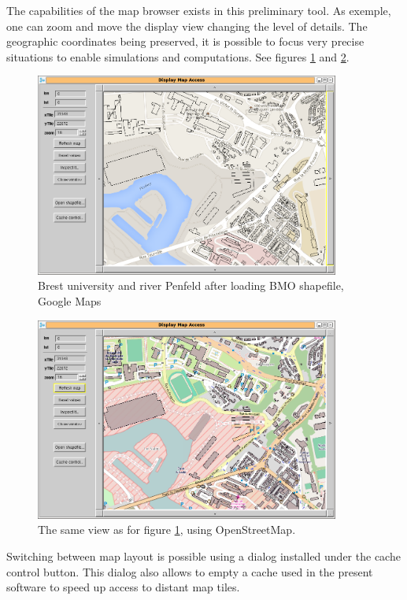 The capabilities of the map browser exists in this preliminary tool. 
As exemple, one can zoom and move the display view changing the level 
of details. The geographic coordinates being preserved, it is possible 
to focus very precise situations to enable simulations and computations. 
See figures \ref{fig:mapAccessGMap} and \ref{fig:mapAccessOSM}. 

\begin{figure}
\begin{center}
\includegraphics[width=10cm]{mapAccessPenfeldGMap.png}
\caption{Brest university and river Penfeld after loading BMO shapefile, 
Google Maps}
\label{fig:mapAccessGMap}
\end{center}
\end{figure}

\begin{figure}
\begin{center}
\includegraphics[width=10cm]{mapAccessPenfeldOSM.png}
\caption{The same view as for figure \ref{fig:mapAccessGMap}, using OpenStreetMap.}
\label{fig:mapAccessOSM}
\end{center}
\end{figure}

Switching between map layout is possible using a dialog installed 
under the cache control button. This dialog also allows to empty a cache 
used in the present software to speed up access to distant map tiles. 


